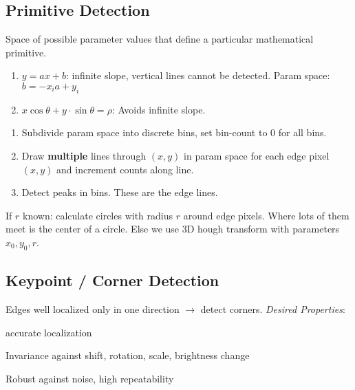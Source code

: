 \subsection{Primitive Detection}

\begin{definition}
  Space of possible parameter values that define a particular mathematical primitive.
\end{definition}

\begin{definition}
  \begin{enumerate}
    \item \(y = ax + b\): infinite slope, vertical lines cannot be detected. Param space: \(b = -x_i a + y_i\)
    \item \(x \cos \theta + y \cdot \sin \theta = \rho\): Avoids infinite slope.
  \end{enumerate}
\end{definition}

\begin{algorithm}
  \begin{enumerate}
    \item Subdivide param space into discrete bins, set bin-count to 0 for all bins.
    \item Draw \textbf{multiple} lines through \((x, y)\) in param space for each edge pixel \((x, y)\) and increment counts along line.
    \item Detect peaks in bins. These are the edge lines.
  \end{enumerate}
\end{algorithm}

\begin{definition}
  If \(r\) known: calculate circles with radius \(r\) around edge pixels. Where lots of them meet is the center of a circle. Else we use 3D hough transform with parameters \(x_0, y_0, r\).
\end{definition}

\pagebreak
\subsection{Keypoint / Corner Detection}
Edges well localized only in one direction \(\to\) detect corners.
\textit{Desired Properties}:
\begin{itemize*}
  \item accurate localization
  \item Invariance against shift, rotation, scale, brightness change
  \item Robust against noise, high repeatability
\end{itemize*}

